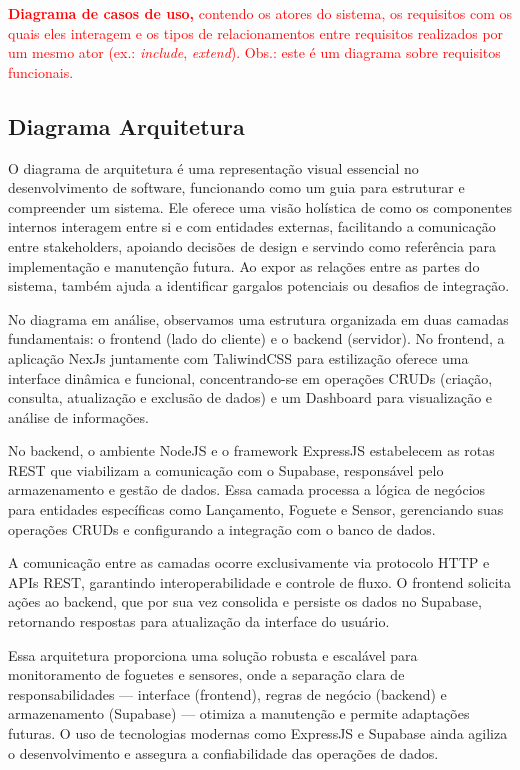     \item \textcolor{red}{ \textbf{Diagrama de casos de uso,} contendo os atores do sistema, os requisitos com os quais eles interagem e os tipos de relacionamentos entre requisitos realizados por um mesmo ator (ex.: \textit{include}, \textit{extend}). Obs.: este é um diagrama sobre requisitos funcionais.}
    
    
  \subsection{Diagrama Arquitetura}
  O diagrama de arquitetura é uma representação visual essencial no desenvolvimento de software, funcionando como um guia para estruturar e compreender um sistema. Ele oferece uma visão holística de como os componentes internos interagem entre si e com entidades externas, facilitando a comunicação entre stakeholders, apoiando decisões de design e servindo como referência para implementação e manutenção futura. Ao expor as relações entre as partes do sistema, também ajuda a identificar gargalos potenciais ou desafios de integração.

No diagrama em análise, observamos uma estrutura organizada em duas camadas fundamentais: o frontend (lado do cliente) e o backend (servidor). No frontend, a aplicação NexJs juntamente com TaliwindCSS para estilização oferece uma interface dinâmica e funcional, concentrando-se em operações CRUDs (criação, consulta, atualização e exclusão de dados) e um Dashboard para visualização e análise de informações.

No backend, o ambiente NodeJS e o framework ExpressJS estabelecem as rotas REST que viabilizam a comunicação com o Supabase, responsável pelo armazenamento e gestão de dados. Essa camada processa a lógica de negócios para entidades específicas como Lançamento, Foguete e Sensor, gerenciando suas operações CRUDs e configurando a integração com o banco de dados.

A comunicação entre as camadas ocorre exclusivamente via protocolo HTTP e APIs REST, garantindo interoperabilidade e controle de fluxo. O frontend solicita ações ao backend, que por sua vez consolida e persiste os dados no Supabase, retornando respostas para atualização da interface do usuário.

Essa arquitetura proporciona uma solução robusta e escalável para monitoramento de foguetes e sensores, onde a separação clara de responsabilidades — interface (frontend), regras de negócio (backend) e armazenamento (Supabase) — otimiza a manutenção e permite adaptações futuras. O uso de tecnologias modernas como ExpressJS e Supabase ainda agiliza o desenvolvimento e assegura a confiabilidade das operações de dados.

